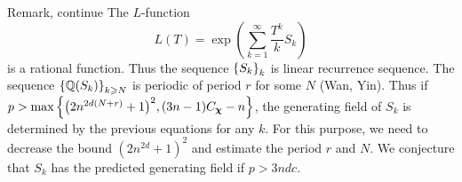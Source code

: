 \documentclass[aspectratio=169,handout]{beamer}
\newcommand\bchi{{\boldsymbol\chi}}
\begin{document}
\begin{frame}{Remark, continue}
The $L$-function 
	\[L(T)=\exp\left(\sum_{k=1}^\infty \frac{T^k}{k} S_k\right)\]
is a rational function.
Thus the sequence ${\left\{S_k\right\}}_k$ is linear recurrence sequence.
The sequence ${\left\{{\mathbb{Q}}(S_k)\right\}}_{k\geqslant N}$ is periodic of period $r$ for some $N$ (Wan, Yin).
Thus if $p>\max\set{\bigl(2n^{2d(N+r)}+1\bigr)^2,(3n-1)C_\bchi-n}$,  the generating field of $S_k$ is determined by the previous equations for any $k$.
For this purpose, we need to decrease the bound $(2n^{2d}+1)^2$ and estimate the period $r$ and $N$.
We conjecture that $S_k$ has the predicted generating field if $p>3ndc$.
\end{frame}

\framethanks
\end{document}
